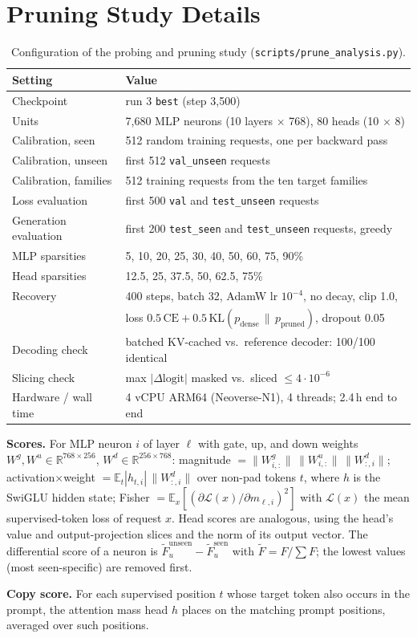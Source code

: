 \documentclass[11pt,a4paper]{article}
\begin{document}



\appendix

\section{Pruning Study Details}
\label{app:pruning}

\begin{table}[h]
\centering\small
\begin{tabular}{ll}
\toprule
Setting & Value \\
\midrule
Checkpoint & run 3 \texttt{best} (step 3{,}500) \\
Units & 7{,}680 MLP neurons (10 layers $\times$ 768), 80 heads (10 $\times$ 8) \\
Calibration, seen & 512 random training requests, one per backward pass \\
Calibration, unseen & first 512 \texttt{val\_unseen} requests \\
Calibration, families & 512 training requests from the ten target families \\
Loss evaluation & first 500 \texttt{val} and \texttt{test\_unseen} requests \\
Generation evaluation & first 200 \texttt{test\_seen} and \texttt{test\_unseen} requests, greedy \\
MLP sparsities & 5, 10, 20, 25, 30, 40, 50, 60, 75, 90\% \\
Head sparsities & 12.5, 25, 37.5, 50, 62.5, 75\% \\
Recovery & 400 steps, batch 32, AdamW lr $10^{-4}$, no decay, clip 1.0, \\
 & loss $0.5\,\mathrm{CE} + 0.5\,\mathrm{KL}(p_{\text{dense}}\,\|\,p_{\text{pruned}})$, dropout 0.05 \\
Decoding check & batched KV-cached vs.\ reference decoder: 100/100 identical \\
Slicing check & max $|\Delta\text{logit}|$ masked vs.\ sliced $\leq 4\cdot10^{-6}$ \\
Hardware / wall time & 4 vCPU ARM64 (Neoverse-N1), 4 threads; 2.4\,h end to end \\
\bottomrule
\end{tabular}
\caption{Configuration of the probing and pruning study
(\texttt{scripts/prune\_analysis.py}).}
\label{tab:pruneconfig}
\end{table}

\textbf{Scores.} For MLP neuron $i$ of layer $\ell$ with gate, up, and down
weights $W^g, W^u \in \mathbb{R}^{768\times256}$, $W^d \in
\mathbb{R}^{256\times768}$: magnitude $=\|W^g_{i,:}\|\,\|W^u_{i,:}\|\,
\|W^d_{:,i}\|$; activation$\times$weight $=\mathbb{E}_t|h_{t,i}|\,
\|W^d_{:,i}\|$ over non-pad tokens $t$, where $h$ is the SwiGLU hidden state;
Fisher $=\mathbb{E}_x[(\partial\mathcal{L}(x)/\partial m_{\ell,i})^2]$ with
$\mathcal{L}(x)$ the mean supervised-token loss of request $x$. Head scores
are analogous, using the head's value and output-projection slices and the
norm of its output vector. The differential score of a neuron is
$\tilde F^{\text{unseen}}_u - \tilde F^{\text{seen}}_u$ with
$\tilde F = F/\sum F$; the lowest values (most seen-specific) are removed
first.

\textbf{Copy score.} For each supervised position $t$ whose target token also
occurs in the prompt, the attention mass head $h$ places on the matching
prompt positions, averaged over such positions.
\end{document}

